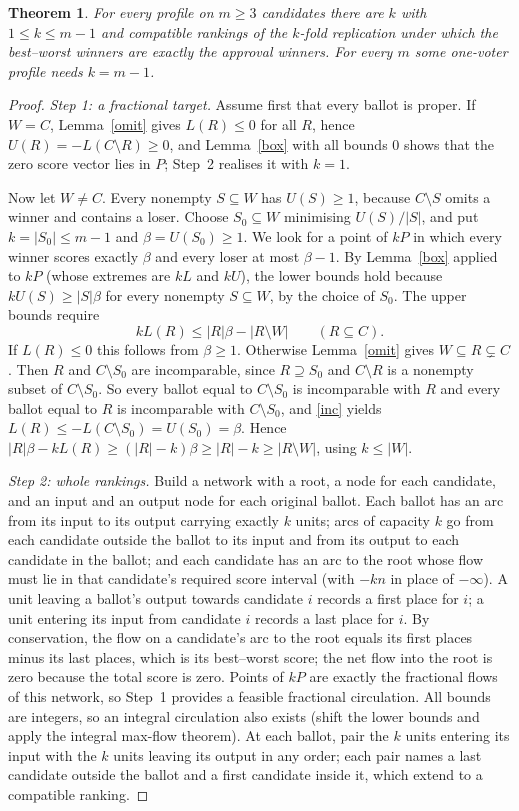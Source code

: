\documentclass[11pt,a4paper]{article}
\newtheorem{theorem}{Theorem}
\theoremstyle{definition}
\theoremstyle{remark}
\begin{document}
\begin{theorem}\label{main}
For every profile on $m\ge3$ candidates there are $k$ with $1\le k\le m-1$ and compatible rankings of the $k$-fold replication under which the best--worst winners are exactly the approval winners. For every $m$ some one-voter profile needs $k=m-1$.
\end{theorem}
\begin{proof}
\emph{Step 1: a fractional target.} Assume first that every ballot is proper. If $W=C$, Lemma~\ref{omit} gives $L(R)\le0$ for all $R$, hence $U(R)=-L(C\setminus R)\ge0$, and Lemma~\ref{box} with all bounds $0$ shows that the zero score vector lies in $P$; Step~2 realises it with $k=1$.

Now let $W\ne C$. Every nonempty $S\subseteq W$ has $U(S)\ge1$, because $C\setminus S$ omits a winner and contains a loser. Choose $S_0\subseteq W$ minimising $U(S)/|S|$, and put $k=|S_0|\le m-1$ and $\beta=U(S_0)\ge1$. We look for a point of $kP$ in which every winner scores exactly $\beta$ and every loser at most $\beta-1$. By Lemma~\ref{box} applied to $kP$ (whose extremes are $kL$ and $kU$), the lower bounds hold because $kU(S)\ge|S|\beta$ for every nonempty $S\subseteq W$, by the choice of $S_0$. The upper bounds require
\[
 kL(R)\le |R|\beta-|R\setminus W|\qquad(R\subseteq C).
\]
If $L(R)\le0$ this follows from $\beta\ge1$. Otherwise Lemma~\ref{omit} gives $W\subseteq R\subsetneq C$. Then $R$ and $C\setminus S_0$ are incomparable, since $R\supseteq S_0$ and $C\setminus R$ is a nonempty subset of $C\setminus S_0$. So every ballot equal to $C\setminus S_0$ is incomparable with $R$ and every ballot equal to $R$ is incomparable with $C\setminus S_0$, and \eqref{inc} yields $L(R)\le-L(C\setminus S_0)=U(S_0)=\beta$. Hence $|R|\beta-kL(R)\ge(|R|-k)\beta\ge|R|-k\ge|R\setminus W|$, using $k\le|W|$.

\emph{Step 2: whole rankings.} Build a network with a root, a node for each candidate, and an input and an output node for each original ballot. Each ballot has an arc from its input to its output carrying exactly $k$ units; arcs of capacity $k$ go from each candidate outside the ballot to its input and from its output to each candidate in the ballot; and each candidate has an arc to the root whose flow must lie in that candidate's required score interval (with $-kn$ in place of $-\infty$). A unit leaving a ballot's output towards candidate $i$ records a first place for $i$; a unit entering its input from candidate $i$ records a last place for $i$. By conservation, the flow on a candidate's arc to the root equals its first places minus its last places, which is its best--worst score; the net flow into the root is zero because the total score is zero. Points of $kP$ are exactly the fractional flows of this network, so Step~1 provides a feasible fractional circulation. All bounds are integers, so an integral circulation also exists (shift the lower bounds and apply the integral max-flow theorem). At each ballot, pair the $k$ units entering its input with the $k$ units leaving its output in any order; each pair names a last candidate outside the ballot and a first candidate inside it, which extend to a compatible ranking.


\end{proof}
\end{document}
